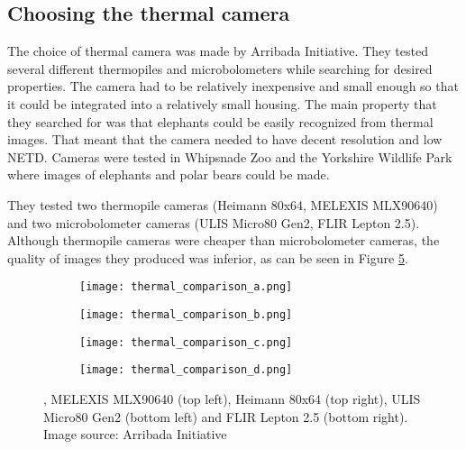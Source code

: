 \subsection{ Choosing the thermal camera}

The choice of thermal camera was made by Arribada Initiative\cite{thermal_comparison}.
They tested several different thermopiles and microbolometers while searching for desired properties.
The camera had to be relatively inexpensive and small enough so that it could be integrated into a relatively small housing.
The main property that they searched for was that elephants could be easily recognized from thermal images.
That meant that the camera needed to have decent resolution and low NETD.
Cameras were tested in Whipsnade Zoo and the Yorkshire Wildlife Park where images of elephants and polar bears could be made.

They tested two thermopile cameras (Heimann 80x64, MELEXIS MLX90640) and two microbolometer cameras (ULIS Micro80 Gen2, FLIR Lepton 2.5).
Although thermopile cameras were cheaper than microbolometer cameras, the quality of images they produced was inferior, as can be seen in Figure \ref{thermal_comparison_images}.

\begin{figure}[ht]
    \begin{subfigure}{0.5\textwidth}
        \centering
        \texttt{[image: thermal\_comparison\_a.png]} 
        \label{thermal_comparison_a}
    \end{subfigure}
    \begin{subfigure}{0.5\textwidth}
        \centering
        \texttt{[image: thermal\_comparison\_b.png]} 
        \label{thermal_comparison_b}
    \end{subfigure}
    \begin{subfigure}{0.5\textwidth}
        \centering
        \texttt{[image: thermal\_comparison\_c.png]} 
        \label{thermal_comparison_c}
    \end{subfigure}
    \begin{subfigure}{0.5\textwidth}
        \centering
        \texttt{[image: thermal\_comparison\_d.png]} 
        \label{thermal_comparison_d}
    \end{subfigure}
\caption[Comparison of image quality made by different thermal cameras]{, MELEXIS MLX90640 (top left), Heimann 80x64 (top right), ULIS Micro80 Gen2 (bottom left) and FLIR Lepton 2.5 (bottom right). Image source: Arribada Initiative \cite{thermal_comparison}}
    \label{thermal_comparison_images}
\end{figure}

